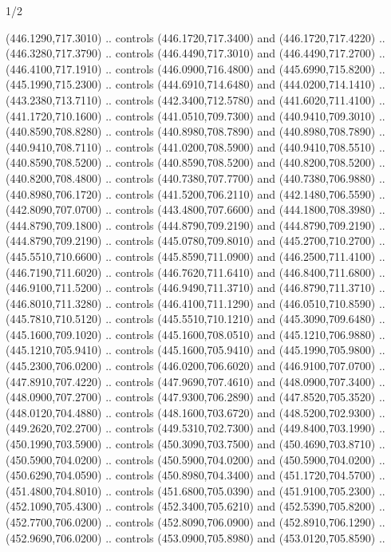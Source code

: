 \begin{flagdescription}{1/2}
\begin{scope}[xshift=0.5\flaglength]
\begin{scope}[scale=0.00745\flagwidth,xshift=-12.1mm,yshift=41.7mm]
\begin{scope}[y=0.80pt, x=0.80pt, yscale=-1, xscale=1, inner sep=0pt, outer sep=0pt]
\begin{scope}[cm={{1.33333,0.0,0.0,-1.33333,(0.0,114.66667)}}]
\begin{scope}[scale=0.100]
  (446.1290,717.3010) .. controls (446.1720,717.3400) and (446.1720,717.4220) ..
  (446.3280,717.3790) .. controls (446.4490,717.3010) and (446.4490,717.2700) ..
  (446.4100,717.1910) .. controls (446.0900,716.4800) and (445.6990,715.8200) ..
  (445.1990,715.2300) .. controls (444.6910,714.6480) and (444.0200,714.1410) ..
  (443.2380,713.7110) .. controls (442.3400,712.5780) and (441.6020,711.4100) ..
  (441.1720,710.1600) .. controls (441.0510,709.7300) and (440.9410,709.3010) ..
  (440.8590,708.8280) .. controls (440.8980,708.7890) and (440.8980,708.7890) ..
  (440.9410,708.7110) .. controls (441.0200,708.5900) and (440.9410,708.5510) ..
  (440.8590,708.5200) .. controls (440.8590,708.5200) and (440.8200,708.5200) ..
  (440.8200,708.4800) .. controls (440.7380,707.7700) and (440.7380,706.9880) ..
  (440.8980,706.1720) .. controls (441.5200,706.2110) and (442.1480,706.5590) ..
  (442.8090,707.0700) .. controls (443.4800,707.6600) and (444.1800,708.3980) ..
  (444.8790,709.1800) .. controls (444.8790,709.2190) and (444.8790,709.2190) ..
  (444.8790,709.2190) .. controls (445.0780,709.8010) and (445.2700,710.2700) ..
  (445.5510,710.6600) .. controls (445.8590,711.0900) and (446.2500,711.4100) ..
  (446.7190,711.6020) .. controls (446.7620,711.6410) and (446.8400,711.6800) ..
  (446.9100,711.5200) .. controls (446.9490,711.3710) and (446.8790,711.3710) ..
  (446.8010,711.3280) .. controls (446.4100,711.1290) and (446.0510,710.8590) ..
  (445.7810,710.5120) .. controls (445.5510,710.1210) and (445.3090,709.6480) ..
  (445.1600,709.1020) .. controls (445.1600,708.0510) and (445.1210,706.9880) ..
  (445.1210,705.9410) .. controls (445.1600,705.9410) and (445.1990,705.9800) ..
  (445.2300,706.0200) .. controls (446.0200,706.6020) and (446.9100,707.0700) ..
  (447.8910,707.4220) .. controls (447.9690,707.4610) and (448.0900,707.3400) ..
  (448.0900,707.2700) .. controls (447.9300,706.2890) and (447.8520,705.3520) ..
  (448.0120,704.4880) .. controls (448.1600,703.6720) and (448.5200,702.9300) ..
  (449.2620,702.2700) .. controls (449.5310,702.7300) and (449.8400,703.1990) ..
  (450.1990,703.5900) .. controls (450.3090,703.7500) and (450.4690,703.8710) ..
  (450.5900,704.0200) .. controls (450.5900,704.0200) and (450.5900,704.0200) ..
  (450.6290,704.0590) .. controls (450.8980,704.3400) and (451.1720,704.5700) ..
  (451.4800,704.8010) .. controls (451.6800,705.0390) and (451.9100,705.2300) ..
  (452.1090,705.4300) .. controls (452.3400,705.6210) and (452.5390,705.8200) ..
  (452.7700,706.0200) .. controls (452.8090,706.0900) and (452.8910,706.1290) ..
  (452.9690,706.0200) .. controls (453.0900,705.8980) and (453.0120,705.8590) ..

\end{scope}
\end{scope}
\end{scope}
\end{scope}
\end{scope}
\end{flagdescription}
